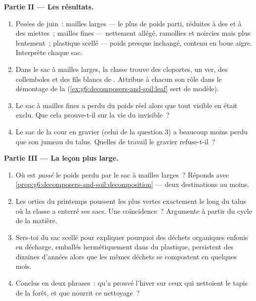 \begin{problem}
\medskip\noindent\textbf{Partie II --- Les résultats.}
\begin{enumerate}[resume]
  \item Pesées de juin~: mailles larges --- le plus de poids parti,
         réduites à des  et à des miettes~;
        mailles fines --- nettement allégé,  ramollies et
        noircies mais plus lentement~; plastique scellé --- poids
        presque inchangé, contenu en boue aigre. Interprète chaque
        sac.
  \item Dans le sac à mailles larges, la classe trouve des
        cloportes, un ver, des collemboles et des fils blancs de
        . Attribue à chacun son rôle dans le démontage de
        la  (\cref{ex:g6:decomposers-and-soil:leaf} sert de
        modèle).
  \item Le sac à mailles fines a perdu du poids réel alors que tout
         visible en était exclu. Que cela prouve-t-il sur la
        vie du  invisible~?
  \item Le sac de la cour en gravier (celui de la question 3) a
        beaucoup moins perdu que son jumeau du talus. Quelles
         de travail le gravier refuse-t-il~?
\end{enumerate}

\medskip\noindent\textbf{Partie III --- La leçon plus large.}
\begin{enumerate}[resume]
  \item Où est \emph{passé} le poids perdu par le sac à mailles
        larges~? Réponds avec
        \cref{prop:g6:decomposers-and-soil:decomposition} --- deux
        destinations au moins.
  \item Les orties du printemps poussent les plus vertes exactement
        le long du talus où la classe a enterré ses sacs. Une
        coïncidence~? Argumente à partir du cycle de la matière.
  \item Sers-toi du sac scellé pour expliquer pourquoi des déchets
        organiques enfouis en décharge, emballés hermétiquement
        dans du plastique, persistent des dizaines d'années alors
        que les mêmes déchets se compostent en quelques mois.
  \item Conclus en deux phrases~: qu'a prouvé l'hiver sur ceux qui
        nettoient le tapis de la forêt, et que nourrit ce
        nettoyage~?
\end{enumerate}
\end{problem}
